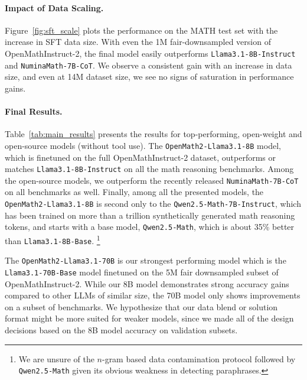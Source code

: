 \paragraph{Impact of Data Scaling.} 
Figure~\ref{fig:sft_scale} plots the performance on the MATH test set with the increase in SFT data size. With even the 1M fair-downsampled version of OpenMathInstruct-2, the final model easily outperforms \texttt{Llama3.1-8B-Instruct} and \texttt{NuminaMath-7B-CoT}.  
We observe a consistent gain with an increase in data size, and even at 14M dataset size, we see no signs of saturation in performance gains.

\paragraph{Final Results.} Table~\ref{tab:main_results} presents the results for top-performing, open-weight and open-source models (without tool use). 
The \texttt{OpenMath2-Llama3.1-8B} model, which is finetuned on the full OpenMathInstruct-2 dataset, outperforms or matches \texttt{Llama3.1-8B-Instruct} on all the math reasoning benchmarks.  
Among the open-source models, we outperform the recently released \texttt{NuminaMath-7B-CoT} on all benchmarks as well. 
Finally, among all the presented models, the \texttt{OpenMath2-Llama3.1-8B} is second only to the \texttt{Qwen2.5-Math-7B-Instruct}, which has been trained on more than a trillion synthetically generated math reasoning tokens, and starts with a base model, \texttt{Qwen2.5-Math}, which is about 35\% better than \texttt{Llama3.1-8B-Base}.
\footnote{We are unsure of the $n$-gram based data contamination protocol followed by \texttt{Qwen2.5-Math} given its obvious weakness in detecting paraphrases.}



The \texttt{OpenMath2-Llama3.1-70B} is our strongest performing model which is the \texttt{Llama3.1-70B-Base} model finetuned on the 5M fair downsampled subset of OpenMathInstruct-2. While our 8B model demonstrates strong accuracy gains compared to other LLMs of similar size, the 70B model only shows improvements on a subset of benchmarks. We hypothesize that our data blend or solution format might be more suited for weaker models, since we made all of the design decisions based on the 8B model accuracy on validation subsets.

